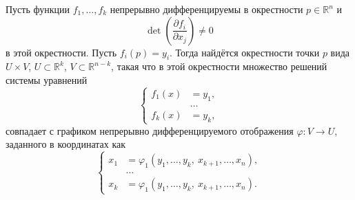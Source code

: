 \begin{to_thr}
     Пусть функции $f_1, \ldots, f_k$ непрерывно дифференцируемы в окрестности $p \in \mathbb{R}^n$ и 
    \begin{equation*}
        \det \left(
            \frac{\partial f_i}{\partial x_j} 
        \right) \neq 0
    \end{equation*}
    в этой окрестности. Пусть $f_i(p) = y_i$. Тогда найдётся окрестности точки $p$ вида $U \times V$, $U \subset \mathbb{R}^k$, $V \subset \mathbb{R}^{n-k}$, такая что в этой окрестности множество решений системы уравнений
    \begin{equation*}
        \left\{\begin{aligned}
            f_1(x) &= y_1, \\
            &\ldots \\
            f_k(x) &= y_k,
        \end{aligned}\right.
    \end{equation*}
    совпадает с графиком непрерывно дифференцируемого отображения $\varphi \colon V \to U$, заданного в координатах как
    \begin{equation*}
        \left\{\begin{aligned}
            x_1 &= \varphi_1 (y_1, \ldots, y_k,\ x_{k+1}, \ldots, x_n),\\
            &\ldots\\
            x_k &= \varphi_1 (y_1, \ldots, y_k,\ x_{k+1}, \ldots, x_n).
        \end{aligned}\right.
    \end{equation*}
\end{to_thr}
